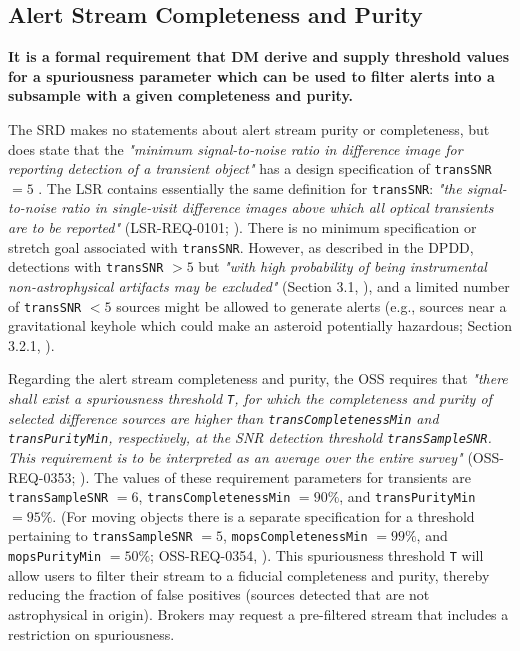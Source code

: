 \documentclass[DM,authoryear,toc]{lsstdoc}
\begin{document}
\subsection{Alert Stream Completeness and Purity}\label{ssec:comp_pure}

{\bf It is a formal requirement that DM derive and supply threshold values for a spuriousness parameter which can be used to filter alerts into a subsample with a given completeness and purity.}

The SRD makes no statements about alert stream purity or completeness, but does state that the {\it "minimum signal-to-noise ratio in difference image for reporting detection of a transient object"} has a design specification of {\tt transSNR} $=5$ . The LSR contains essentially the same definition for {\tt transSNR}: {\it "the signal-to-noise ratio in single-visit difference images above which all optical transients are to be reported"} (LSR-REQ-0101; ). There is no minimum specification or stretch goal associated with {\tt transSNR}. However, as described in the DPDD, detections with {\tt transSNR} $>5$ but {\it "with high probability of being instrumental non-astrophysical artifacts may be excluded"} (Section 3.1, ), and a limited number of {\tt transSNR} $<5$ sources might be allowed to generate alerts (e.g., sources near a gravitational keyhole which could make an asteroid potentially hazardous; Section 3.2.1, ). 

Regarding the alert stream completeness and purity, the OSS requires that {\it "there shall exist a spuriousness threshold {\tt T}, for which the completeness and purity of selected difference sources are higher than {\tt transCompletenessMin} and {\tt transPurityMin}, respectively, at the SNR detection threshold {\tt transSampleSNR}. This requirement is to be interpreted as an average over the entire survey"} (OSS-REQ-0353; ). The values of these requirement parameters for transients are {\tt transSampleSNR} $=6$, {\tt transCompletenessMin} $=90\%$, and {\tt transPurityMin} $=95\%$. (For moving objects there is a separate specification for a threshold pertaining to {\tt transSampleSNR} $=5$, {\tt mopsCompletenessMin} $=99\%$, and {\tt mopsPurityMin} $=50\%$; OSS-REQ-0354, ). This spuriousness threshold {\tt T} will allow users to filter their stream to a fiducial completeness and purity, thereby reducing the fraction of false positives (sources detected that are not astrophysical in origin). Brokers may request a pre-filtered stream that includes a restriction on spuriousness.
\end{document}
